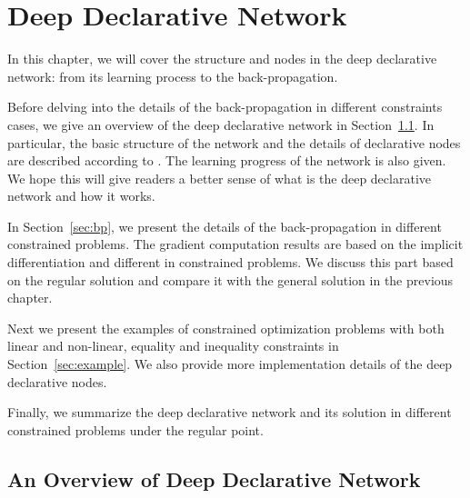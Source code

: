 \chapter{Deep Declarative Network}
\label{cha:ddn}
In this chapter, we will cover the structure and nodes in the deep declarative network: from its learning process to the back-propagation.
\par Before delving into the details of the back-propagation in different constraints cases, we give an overview of the deep declarative network in Section~\ref{sec:overview-ddn}. In particular, the basic structure of the network and the details of declarative nodes are described according to \cite{SG:19}. The learning progress of the network is also given. We hope this will give readers a better sense of what is the deep declarative network and how it works. 
\par In Section~\ref{sec:bp}, we present the details of the back-propagation in different constrained problems. The gradient computation results are based on the implicit differentiation and different in constrained problems. We discuss this part based on the regular solution and compare it with the general solution in the previous chapter. 
\par Next we present the examples of constrained optimization problems with both linear and non-linear, equality and inequality constraints in Section~\ref{sec:example}. We also provide more implementation details of the deep declarative nodes. 
\par Finally, we summarize the deep declarative network and its solution in different constrained problems under the regular point. 


\section{An Overview of Deep Declarative Network}
\label{sec:overview-ddn}
